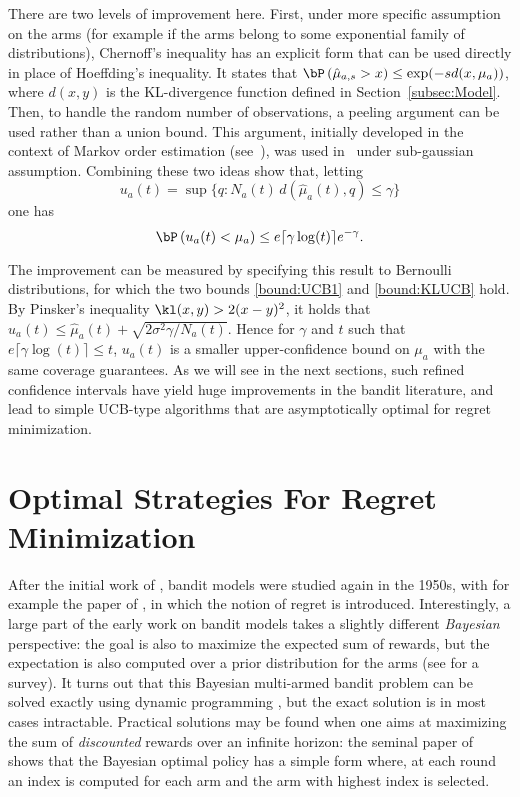 \documentclass[proc]{edpsmath}
\begin{document}
	There are two levels of improvement here. First, under more specific assumption on the arms (for example if the arms belong to some exponential family of distributions), Chernoff's inequality has an explicit form that can be used directly in place of Hoeffding's inequality. It states that $\bP\left(\hat{\mu}_{a,s} > x\right)\leq \exp(-sd(x,\mu_a))$, where $d(x,y)$ is the KL-divergence function defined in Section~\ref{subsec:Model}. Then, to handle the random number of observations, a peeling argument can be used rather than a union bound. This argument, initially developed in the context of Markov order estimation (see~\cite{GL11}), was used in~\cite{GarivierMoulines11,Bubeck:Thesis} under sub-gaussian assumption. Combining these two ideas \cite{AOKLUCB} show that, letting 
	\[u_a(t) = \sup \{q : N_a(t)\, d (\hat{\mu}_a(t) , q) \leq \gamma \}\]
	one has 
	\begin{equation}\bP\left(u_a(t) < \mu_a\right) \leq e \lceil\gamma \log(t)\rceil e^{-\gamma}.\label{bound:KLUCB}\end{equation}
	
	The improvement can be measured by specifying this result to Bernoulli distributions, for which the two bounds \eqref{bound:UCB1} and \eqref{bound:KLUCB} hold. By Pinsker's inequality $\kl(x,y) > 2(x-y)^2$, it holds that $u_a(t) \leq \hat{\mu}_a(t) + \sqrt{2\sigma^2 \gamma/N_a(t)}$. Hence for $\gamma$ and $t$ such that $e \lceil \gamma \log(t) \rceil \leq t$, $u_a(t)$ is a smaller upper-confidence bound on $\mu_a$ with the same coverage guarantees. As we will see in the next sections, such refined confidence intervals have yield huge improvements in the bandit literature, and lead to simple UCB-type algorithms that are asymptotically optimal for regret minimization. 
	
	
	\section{Optimal Strategies For Regret Minimization}\label{sec:RegretMinimization}
	
	After the initial work of \cite{Thompson33}, bandit models were studied again in the 1950s, with for example the paper of \cite{Robbins52Freq}, in which the notion of regret is introduced. Interestingly, a large part of the early work on bandit models takes a slightly different \emph{Bayesian} perspective: the goal is also to maximize the expected sum of rewards, but the expectation is also computed over a prior distribution for the arms (see \cite{Berry:Fristedt85} for a survey). It turns out that this Bayesian multi-armed bandit problem can be solved exactly using dynamic programming \cite{Bellman:Bay56}, but the exact solution is in most cases intractable. Practical solutions may be found when one aims at maximizing the sum of \emph{discounted} rewards over an infinite horizon: the seminal paper of \cite{Gittins79} shows that the Bayesian optimal policy has a simple form where, at each round an index is computed for each arm and the arm with highest index is selected.   
	
\end{document}
